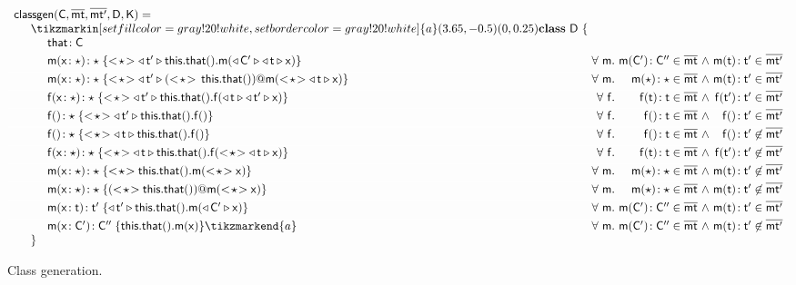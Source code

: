 \documentclass[a4paper,USenglish]{tex/lipics-v2016}
\begin{document}
\begin{figure}[!ht]
\footnotesize
\[\begin{array}{l@{~}r@{}r@{~}r@{~}r@{~}rr}
\arrayrulecolor{white}
\classgen{\C, \bmt, \bmtp, \D,\K}= \\
\SP \tikzmarkin[set fill color=gray!20!white, set border color=gray!20!white]{a}(3.65,-0.5)(0,0.25) \class~\D~\{ \\
\SPP \Fdef\that\C
\\[1mm]
\SPP \Mdef\m\x\any\any {\SubCast\any{\MonCast\tp{\Call{\Get\this\that}\m{\MonCast\Cp{\MonCast\t\x}}}}} 
&
\All m \Mtype\m\Cp\Cpp\in\bmt &\wedge& \Mtype\m\t\tp\in\bmtp
\\[1mm]\hline
\SPP \Mdef\m\x\any\any{
  \SubCast\any{\MonCast\tp{\DynCall{(\SubCast\any{\,\Get\this\that})}\m{\SubCast\any{\MonCast\t\x}}}}} 
&
\All m \Mtype\m\any\any\in\bmt &\wedge& \Mtype\m\t\tp\in\bmtp
\\[1mm]\hline
\SPP \Mdef\f\x\any\any {\SubCast\any{\MonCast\tp{
      \Set{\Get\this\that}\f{\MonCast\t{\MonCast\tp\x}}}}}
&
\All f \Mtype\f\t\t\in\bmt &\wedge& \Mtype\f\tp\tp\in\bmtp
\\[1mm]\hline
\SPP \Mdefz\f\any{\SubCast\any{\MonCast\tp{\Get{\Get\this\that}\f}}}
&
 \All f \Mtype\f{}\t \in \bmt &\wedge& \Mtype\f{}\tp \in \bmtp
\\[1mm]\hline
\SPP \Mdefz\f\any{\SubCast\any{\MonCast\t{\Get{\Get\this\that}\f}}}
&
 \All f \Mtype\f{}\t \in \bmt &\wedge& \Mtype\f{}\tp \not\in \bmtp 
\\[1mm]\hline
\SPP \Mdef\f\x\any\any {\SubCast\any{\MonCast\t{\Call{\Get\this\that}\f{\SubCast\any{\MonCast\t\x}}}}}
& \All f \Mtype\f\t\t\in\bmt &\wedge& \Mtype\f\tp\tp\not\in\bmtp 
\\[1mm]\hline
\SPP \Mdef\m\x\any\any { \SubCast\any{{\Call{\Get\this\that}\m{\SubCast\any\x}}}}
&
\All m \Mtype\m\any\any\in\bmt &\wedge& \Mtype\m\t\tp\not\in \bmtp 
\\[1mm]\hline
\SPP \Mdef\m\x\any\any{ \DynCall{(\SubCast\any{\Get\this\that})}\m{\SubCast\any\x}}
&
\All m \Mtype\m\any\any\in\bmt &\wedge& \Mtype\m\t\tp \not\in\bmtp
\\[1mm]\hline
\SPP \Mdef\m\x\t\tp{ \MonCast\tp{\Call{\Get\this\that}\m{{\MonCast\Cp\x}}}}
&
 \All m \Mtype\m\Cp\Cpp \in\bmt &\wedge& \Mtype\m\t\tp\in\bmtp 
 \\[1mm]\hline
\SPP \Mdef\m\x\Cp\Cpp { \Call{\Get\this\that}\m\x} \tikzmarkend{a}
&
 \All m \Mtype\m\Cp\Cpp \in\bmt &\wedge& \Mtype\m\t\tp \not\in \bmtp \\
\SP\}
\end{array}
\]
\caption{Class generation.}\label{classgen}
\end{figure}
\end{document}
